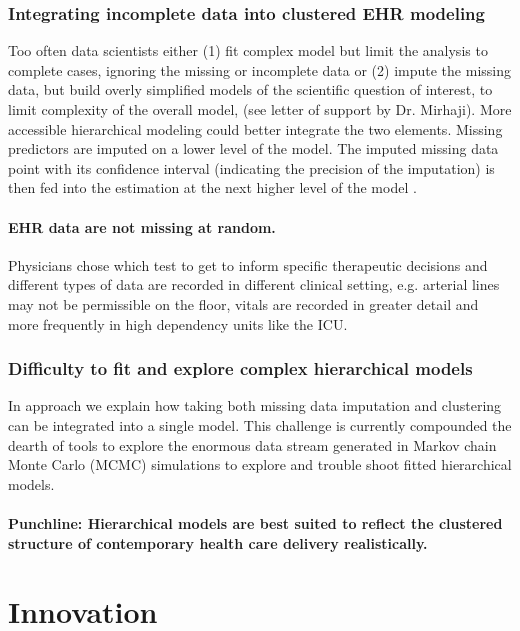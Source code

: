 \documentclass[11pt,notitlepage]{article}
\begin{document}
\section*{Integrating incomplete data into clustered EHR modeling}

Too often data scientists either (1) fit complex model but limit the analysis to complete cases, ignoring the missing or incomplete data or (2) impute the missing data, but build overly simplified models of the scientific question of interest, to limit complexity of the overall model, (see letter of support by Dr. Mirhaji). More accessible hierarchical modeling could better integrate the two elements. Missing predictors are imputed on a lower level of the model. The imputed missing data point with its confidence interval (indicating the precision of the imputation) is then fed into the estimation at the next higher level of the model \cite{Gelman2001imputation}. 

\subsection*{EHR data are not missing at random.} Physicians chose which test to get to inform specific therapeutic decisions and different types of data are recorded in different clinical setting, e.g. arterial lines may not be permissible on the floor, vitals are recorded in greater detail and more frequently in high dependency units like the ICU. 

\section*{Difficulty to fit and explore complex hierarchical models}
In approach we explain  how taking both missing data imputation and clustering can be integrated into a single model. This challenge is currently compounded the dearth of tools to explore the enormous data stream generated in Markov chain Monte Carlo (MCMC) simulations to explore and trouble shoot fitted hierarchical models.  

\subsection*{Punchline: Hierarchical models  are best suited to reflect the clustered structure of contemporary health care delivery realistically.}

\part*{Innovation}
\end{document}
